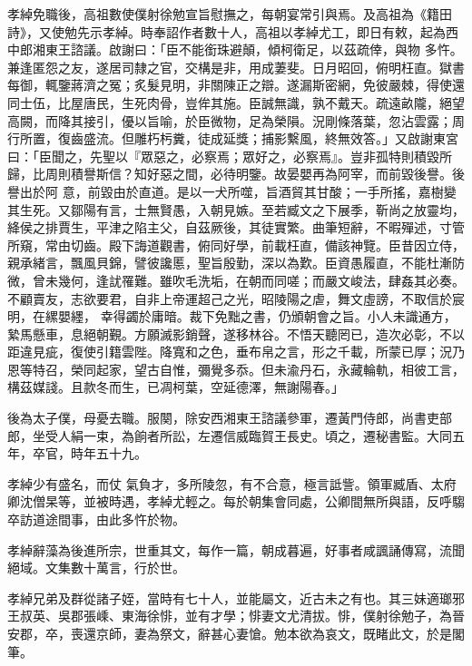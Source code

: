 \begin{pinyinscope}
 孝綽免職後，高祖數使僕射徐勉宣旨慰撫之，每朝宴常引與焉。及高祖為《籍田詩》，又使勉先示孝綽。時奉詔作者數十人，高祖以孝綽尤工，即日有敕，起為西中郎湘東王諮議。啟謝曰：「臣不能銜珠避顛，傾柯衛足，以茲疏倖，與物
 多忤。兼逢匿怨之友，遂居司隸之官，交構是非，用成萋斐。日月昭回，俯明枉直。獄書每御，輒鑒蔣濟之冤；炙髮見明，非關陳正之辯。遂漏斯密網，免彼嚴棘，得使還同士伍，比屋唐民，生死肉骨，豈侔其施。臣誠無識，孰不戴天。疏遠畝隴，絕望高闕，而降其接引，優以旨喻，於臣微物，足為榮隕。況剛條落葉，忽沾雲露；周行所置，復齒盛流。但雕朽杇糞，徒成延獎；捕影繫風，終無效答。」又啟謝東宮曰：「臣聞之，先聖以『眾惡之，必察焉；眾好之，必察焉』。豈非孤特則積毀所歸，比周則積譽斯信？知好惡之間，必待明鑒。故晏嬰再為阿宰，而前毀後譽。後譽出於阿
 意，前毀由於直道。是以一犬所噬，旨酒貿其甘酸；一手所搖，嘉樹變其生死。又鄒陽有言，士無賢愚，入朝見嫉。至若臧文之下展季，靳尚之放靈均，絳侯之排賈生，平津之陷主父，自茲厥後，其徒實繁。曲筆短辭，不暇殫述，寸管所窺，常由切齒。殿下誨道觀書，俯同好學，前載枉直，備該神覽。臣昔因立侍，親承緒言，飄風貝錦，譬彼讒慝，聖旨殷勤，深以為歎。臣資愚履直，不能杜漸防微，曾未幾何，逢訧罹難。雖吹毛洗垢，在朝而同嗟；而嚴文峻法，肆姦其必奏。不顧賣友，志欲要君，自非上帝運超己之光，昭陵陽之虐，舞文虛謗，不取信於宸明，在縲嬰纆，
 幸得蠲於庸暗。裁下免黜之書，仍頒朝會之旨。小人未識通方，縶馬懸車，息絕朝覲。方願滅影銷聲，遂移林谷。不悟天聽罔已，造次必彰，不以距違見疵，復使引籍雲陛。降寬和之色，垂布帛之言，形之千載，所蒙已厚；況乃恩等特召，榮同起家，望古自惟，彌覺多忝。但未渝丹石，永藏輪軌，相彼工言，構茲媒諓。且款冬而生，已凋柯葉，空延德澤，無謝陽春。」



 後為太子僕，母憂去職。服闋，除安西湘東王諮議參軍，遷黃門侍郎，尚書吏部郎，坐受人絹一束，為餉者所訟，左遷信威臨賀王長史。頃之，遷秘書監。大同五年，卒官，時年五十九。



 孝綽少有盛名，而仗
 氣負才，多所陵忽，有不合意，極言詆訾。領軍臧盾、太府卿沈僧杲等，並被時遇，孝綽尤輕之。每於朝集會同處，公卿間無所與語，反呼騶卒訪道途間事，由此多忤於物。



 孝綽辭藻為後進所宗，世重其文，每作一篇，朝成暮遍，好事者咸諷誦傳寫，流聞絕域。文集數十萬言，行於世。



 孝綽兄弟及群從諸子姪，當時有七十人，並能屬文，近古未之有也。其三妹適瑯邪王叔英、吳郡張嵊、東海徐悱，並有才學；悱妻文尤清拔。悱，僕射徐勉子，為晉安郡，卒，喪還京師，妻為祭文，辭甚心妻愴。勉本欲為哀文，既睹此文，於是閣筆。




\end{pinyinscope}
